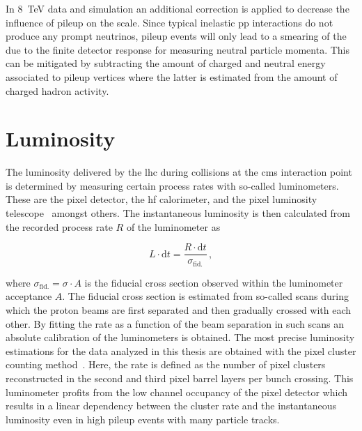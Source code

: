 In 8~TeV data and simulation an additional correction is applied to decrease the influence of pileup on the \met scale. Since typical inelastic \gls{pp} interactions do not produce any prompt neutrinos, pileup events will only lead to a smearing of the \met due to the finite detector response for measuring neutral particle momenta. This can be mitigated by subtracting the amount of charged and neutral energy associated to pileup vertices where the latter is estimated from the amount of charged hadron activity.


\section{Luminosity}

The luminosity delivered by the \gls{lhc} during collisions at the \gls{cms} interaction point is determined by measuring certain process rates with so-called luminometers. These are the pixel detector, the \gls{hf} calorimeter, and the pixel luminosity telescope~\cite{Kornmayer:2039978} amongst others. The instantaneous luminosity is then calculated from the recorded process rate $R$ of the luminometer as

\begin{equation}
L\cdot\mathrm{d}t=\frac{R\cdot\mathrm{d}t}{\sigma_\mathrm{fid.}}\,,
\end{equation}

where $\sigma_\mathrm{fid.}=\sigma\cdot A$ is the fiducial cross section observed within the luminometer acceptance $A$. The fiducial cross section is estimated from so-called  scans during which the proton beams are first separated and then gradually crossed with each other. By fitting the rate as a function of the beam separation in such scans an absolute calibration of the luminometers is obtained. The most precise luminosity estimations for the data analyzed in this thesis are obtained with the pixel cluster counting method~\cite{CMS-PAS-LUM-13-001,CMS-PAS-LUM-15-001,CMS-PAS-LUM-17-001}. Here, the rate is defined as the number of pixel clusters reconstructed in the second and third pixel barrel layers per bunch crossing. This luminometer profits from the low channel occupancy of the pixel detector which results in a linear dependency between the cluster rate and the instantaneous luminosity even in high pileup events with many particle tracks.

